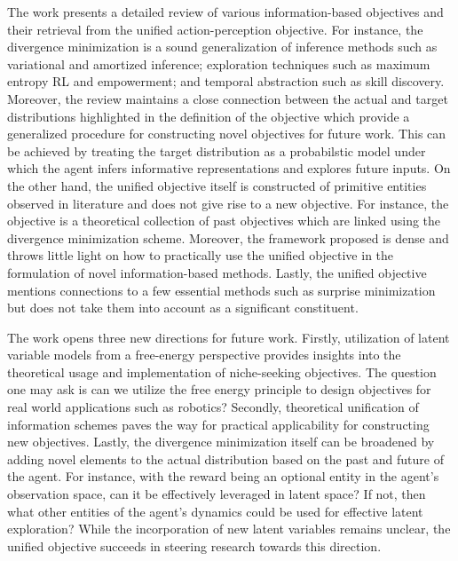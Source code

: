 \documentclass[10.5pt,letterpaper]{article}
\begin{document}
The work presents a detailed review of various information-based objectives and their retrieval from the unified action-perception objective. For instance, the divergence minimization is a sound generalization of inference methods such as variational and amortized inference; exploration techniques such as maximum entropy RL and empowerment; and temporal abstraction such as skill discovery. Moreover, the review maintains a close connection between the actual and target distributions highlighted in the definition of the objective which provide a generalized procedure for constructing novel objectives for future work. This can be achieved by treating the target distribution as a probabilstic model under which the agent infers informative representations and explores future inputs. On the other hand, the unified objective itself is constructed of primitive entities observed in literature and does not give rise to a new objective. For instance, the objective is a theoretical collection of past objectives which are linked using the divergence minimization scheme. Moreover, the framework proposed is dense and throws little light on how to practically use the unified objective in the formulation of novel information-based methods. Lastly, the unified objective mentions connections to a few essential methods such as surprise minimization but does not take them into account as a significant constituent.

The work opens three new directions for future work. Firstly, utilization of latent variable models from a free-energy perspective provides insights into the theoretical usage and implementation of niche-seeking objectives. The question one may ask is can we utilize the free energy principle to design objectives for real world applications such as robotics? Secondly, theoretical unification of information schemes paves the way for practical applicability for constructing new objectives. Lastly, the divergence minimization itself can be broadened by adding novel elements to the actual distribution based on the past and future of the agent. For instance, with the reward being an optional entity in the agent's observation space, can it be effectively leveraged in latent space? If not, then what other entities of the agent's dynamics could be used for effective latent exploration? While the incorporation of new latent variables remains unclear, the unified objective succeeds in steering research towards this direction.
\end{document}
